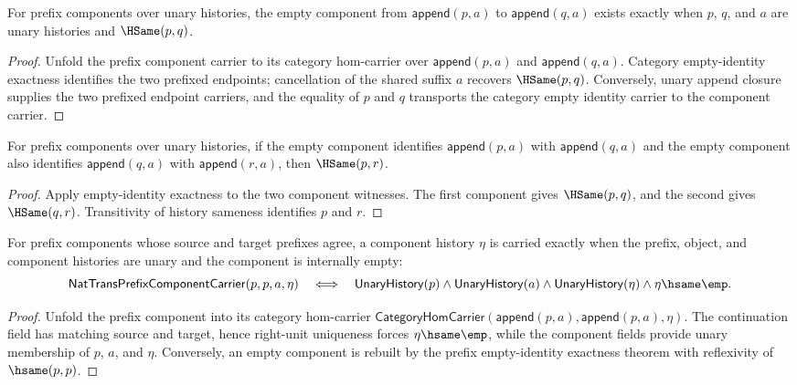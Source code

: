 \begin{theorem}
\label{thm:nattrans-prefix-component-carrier-empty-identity-iff}
For prefix components over unary histories, the empty component from
$\mathsf{append}(p,a)$ to $\mathsf{append}(q,a)$ exists exactly when $p$, $q$,
and $a$ are unary histories and $\HSame(p,q)$.
\end{theorem}
\begin{proof}
Unfold the prefix component carrier to its category hom-carrier over
$\mathsf{append}(p,a)$ and $\mathsf{append}(q,a)$. Category empty-identity
exactness identifies the two prefixed endpoints; cancellation of the shared
suffix $a$ recovers $\HSame(p,q)$. Conversely, unary append closure supplies
the two prefixed endpoint carriers, and the equality of $p$ and $q$ transports
the category empty identity carrier to the component carrier.
\end{proof}

\begin{theorem}
\label{thm:nattrans-prefix-component-empty-identity-prefix-trans}
For prefix components over unary histories, if the empty component identifies
\(\mathsf{append}(p,a)\) with \(\mathsf{append}(q,a)\) and the empty component
also identifies \(\mathsf{append}(q,a)\) with \(\mathsf{append}(r,a)\), then
\(\HSame(p,r)\).
\end{theorem}
\begin{proof}
Apply empty-identity exactness to the two component witnesses. The first
component gives \(\HSame(p,q)\), and the second gives \(\HSame(q,r)\).
Transitivity of history sameness identifies \(p\) and \(r\).
\end{proof}

\begin{theorem}
\label{thm:nattrans-prefix-component-endomorphism-component-empty}
For prefix components whose source and target prefixes agree, a component
history \(\eta\) is carried exactly when the prefix, object, and component
histories are unary and the component is internally empty:
$$
\mathsf{NatTransPrefixComponentCarrier}(p,p,a,\eta)
\quad\Longleftrightarrow\quad
\mathsf{UnaryHistory}(p)\wedge\mathsf{UnaryHistory}(a)\wedge
\mathsf{UnaryHistory}(\eta)\wedge\eta\hsame\emp.
$$
\end{theorem}
\begin{proof}
Unfold the prefix component into its category hom-carrier
\(\mathsf{CategoryHomCarrier}(\mathsf{append}(p,a),\mathsf{append}(p,a),\eta)\).
The continuation field has matching source and target, hence right-unit
uniqueness forces \(\eta\hsame\emp\), while the component fields provide unary
membership of \(p\), \(a\), and \(\eta\). Conversely, an empty component is
rebuilt by the prefix empty-identity exactness theorem with reflexivity of
\(\hsame(p,p)\).
\end{proof}


